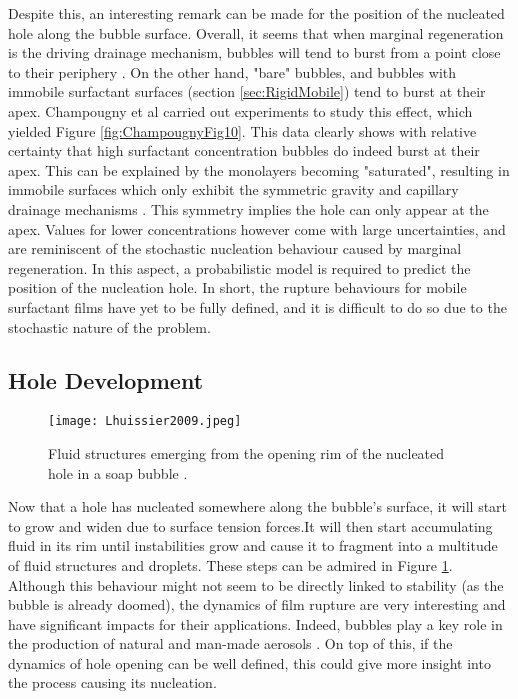 \documentclass[a4paper,12pt]{article}
\numberwithin{equation}{section}
\numberwithin{figure}{section}
\numberwithin{table}{section}
\begin{document}
Despite this, an interesting remark can be made for the position of the nucleated hole along the bubble surface. Overall, it seems that when marginal regeneration is the driving drainage mechanism, bubbles will tend to burst from a point close to their periphery \cite{Bhamla2017, Lhuissier2011}. On the other hand, "bare" bubbles, and bubbles with immobile surfactant surfaces (section \ref{sec:RigidMobile}) tend to burst at their apex. Champougny et al \cite{ChampougnyNotBare2016} carried out experiments to study this effect, which yielded Figure \ref{fig:ChampougnyFig10}. This data clearly shows with relative certainty that high surfactant concentration bubbles do indeed burst at their apex. This can be explained by the monolayers becoming "saturated", resulting in immobile surfaces which only exhibit the symmetric gravity and capillary drainage mechanisms \cite{Bhamla2017}. This symmetry implies the hole can only appear at the apex. Values for lower concentrations however come with large uncertainties, and are reminiscent of the stochastic nucleation behaviour caused by marginal regeneration. In this aspect, a probabilistic model is required to predict the position of the nucleation hole. In short, the rupture behaviours for mobile surfactant films have yet to be fully defined, and it is difficult to do so due to the stochastic nature of the problem.

\subsection{Hole Development}

\begin{figure}[!htbp]
    \centering
    \captionsetup{width=.9\linewidth}
    \texttt{[image: Lhuissier2009.jpeg]}
    \caption{Fluid structures emerging from the opening rim of the nucleated hole in a soap bubble \cite{Lhuissier2009}.}
    \label{fig:Lhuissier2009}
\end{figure}

Now that a hole has nucleated somewhere along the bubble's surface, it will start to grow and widen due to surface tension forces.It will then start accumulating fluid in its rim until instabilities grow and cause it to fragment into a multitude of fluid structures and droplets. These steps can be admired in Figure \ref{fig:Lhuissier2009}. Although this behaviour might not seem to be directly linked to stability (as the bubble is already doomed), the dynamics of film rupture are very interesting and have significant impacts for their applications. Indeed, bubbles play a key role in the production of natural and man-made aerosols \cite{Lhuissier2011, Modini2013}. On top of this, if the dynamics of hole opening can be well defined, this could give more insight into the process causing its nucleation.
\end{document}
